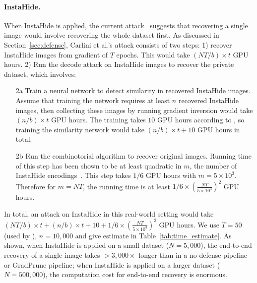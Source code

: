 \paragraph{InstaHide.} When InstaHide is applied, the current attack~\citep{carlini2020attack} suggests that recovering a single image would involve recovering the whole dataset first. As discussed in Section~\ref{sec:defense}, Carlini et al.'s attack consists of two steps: 1) recover InstaHide images from gradient of $T$ epochs. This would take $ (NT/b) \times t$ GPU hours. 2) Run the decode attack \citep{carlini2020attack} on InstaHide images to recover the private dataset, which involves:

\begin{enumerate}
    \item[2a]  Train a neural network to detect similarity in recovered InstaHide images. Assume that training the network requires at least $n$ recovered InstaHide images, then collecting these images by running gradient inversion would take $(n/b) \times t$ GPU hours. The training takes $10$ GPU hours according to \citep{carlini2020attack}, so training the similarity network would take $(n/b) \times t + 10$ GPU hours in total.
    \item[2b] Run the combinotorial algorithm to recover original images. Running time of this step has been shown to be at least quadratic in $m$, the number of InstaHide encodings~\citep{chen2020instahide}. This step takes $1/6$ GPU hours with $m=5\times 10 ^{3}$. Therefore for $m=NT$, the running time is at least $1/6 \times (\frac{NT}{5\times 10 ^{3}})^2$ GPU hours.
\end{enumerate}

In total, an attack on InstaHide in this real-world setting would take $ (NT/b) \times t + (n/b) \times t + 10 + 1/6 \times (\frac{NT}{5\times 10 ^{3}})^2$ GPU hours. We use $T=50$ (used by \citep{carlini2020attack}), $n=10,000$ and give estimate in Table~\ref{tab:time_estimate}. As shown, when InstaHide is applied on a small dataset ($N=5,000$), the end-to-end recovery of a single image takes $>3,000\times$ longer than in a no-defense pipeline or GradPrune pipeline; when InstaHide is applied on a larger dataset ($N=500,000$), the computation cost for end-to-end recovery is enormous.

